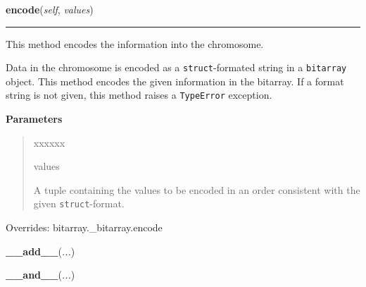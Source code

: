     \begin{boxedminipage}{\textwidth}

    \raggedright \textbf{encode}(\textit{self}, \textit{values})

    \vspace{-1.5ex}

    \rule{\textwidth}{0.5\fboxrule}

This method encodes the information into the chromosome.

Data in the chromosome is encoded as a \texttt{struct}-formated string in a
\texttt{bitarray} object. This method encodes the given information in the
bitarray. If a format string is not given, this method raises a
\texttt{TypeError} exception.
    \vspace{1ex}

      \textbf{Parameters}
      \begin{quote}
        \begin{Ventry}{xxxxxx}

          \item[values]


A tuple containing the values to be encoded in an order consistent
with the given \texttt{struct}-format.
        \end{Ventry}

      \end{quote}

    \vspace{1ex}

      Overrides: bitarray.\_bitarray.encode

    \end{boxedminipage}

    \label{bitarray:_bitarray:__add__}

    \vspace{0.5ex}

    \begin{boxedminipage}{\textwidth}

    \raggedright \textbf{\_\_add\_\_}(\textit{...})

    \end{boxedminipage}

    \label{bitarray:_bitarray:__and__}

    \vspace{0.5ex}

    \begin{boxedminipage}{\textwidth}

    \raggedright \textbf{\_\_and\_\_}(\textit{...})

    \end{boxedminipage}

